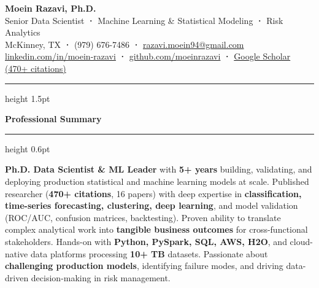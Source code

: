 \documentclass[11pt,letterpaper]{article}
\newcommand{\cvsection}[1]{%
  \vspace{0.2em}%
  {\color{headerblue}\large\bfseries #1}%
  \vspace{0.08em}%
  {\color{goldaccent}\hrule height 0.6pt}%
  \vspace{0.2em}%
}
\begin{document}
\begin{center}
  {\fontsize{20}{24}\selectfont\bfseries\color{headerblue}Moein Razavi, Ph.D.}\\[0.2em]
  {\large\color{darktext}
    Senior Data Scientist\enspace
    {\color{goldaccent}\textbf{·}}\enspace
    Machine Learning \& Statistical Modeling\enspace
    {\color{goldaccent}\textbf{·}}\enspace
    Risk Analytics
  }\\[0.3em]
  {\color{graytext}
    McKinney, TX\enspace
    {\color{goldaccent}\textbf{·}}\enspace
    (979) 676-7486\enspace
    {\color{goldaccent}\textbf{·}}\enspace
    \href{mailto:razavi.moein94@gmail.com}{razavi.moein94@gmail.com}
  }\\[0.15em]
  {\color{graytext}
    \href{https://linkedin.com/in/moein-razavi}{linkedin.com/in/moein-razavi}\enspace
    {\color{goldaccent}\textbf{·}}\enspace
    \href{https://github.com/moeinrazavi}{github.com/moeinrazavi}\enspace
    {\color{goldaccent}\textbf{·}}\enspace
    {\color{accentcolor}\href{https://scholar.google.com/citations?user=wj_qWaQAAAAJ}{Google Scholar (470+ citations)}}
  }
\end{center}

\vspace{0.15em}
{\color{goldaccent}\hrule height 1.5pt}
\vspace{0.25em}

\cvsection{Professional Summary}

{\color{darktext}
\textbf{Ph.D. Data Scientist \& ML Leader} with \textbf{5+ years} building, validating, and deploying production statistical and machine learning models at scale. Published researcher (\textbf{470+ citations}, 16 papers) with deep expertise in \textbf{classification, time-series forecasting, clustering, deep learning}, and model validation (ROC/AUC, confusion matrices, backtesting). Proven ability to translate complex analytical work into \textbf{tangible business outcomes} for cross-functional stakeholders. Hands-on with \textbf{Python, PySpark, SQL, AWS, H2O}, and cloud-native data platforms processing \textbf{10+ TB} datasets. Passionate about \textbf{challenging production models}, identifying failure modes, and driving data-driven decision-making in risk management.
}
\end{document}
